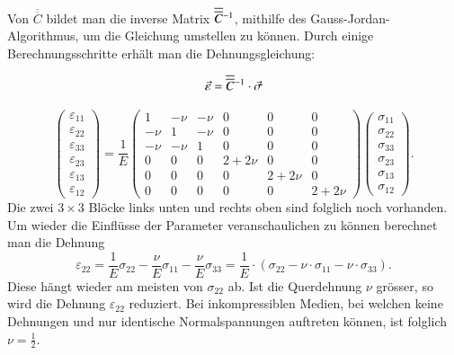 Von  $\overline{\overline{C}}$ bildet man die inverse Matrix $\overline{\overline{C}}\mathstrut^{-1}$, mithilfe des Gauss-Jordan-Algorithmus, um die Gleichung umstellen zu können.
%
Durch einige Berechnungsschritte erhält man die Dehnungsgleichung:

\[
\vec{\varepsilon}
=
\overline{\overline{C}}\mathstrut^{-1}\cdot \vec{\sigma}
\]

\[
\begin{pmatrix}
	\varepsilon_{11}\\
	\varepsilon_{22}\\
	\varepsilon_{33}\\
	\varepsilon_{23}\\
	\varepsilon_{13}\\
	\varepsilon_{12}
\end{pmatrix}
=
\frac{1}{E}
\left(
\begin{array}{ccc|ccc}
	   1 & -\nu & -\nu & 0      & 0      & 0     \\
	-\nu &    1 & -\nu & 0      & 0      & 0     \\
	-\nu & -\nu &    1 & 0      & 0      & 0     \\
\hline
 	   0 &    0 &    0 & 2+2\nu & 0      & 0     \\
	   0 &    0 &    0 &      0 & 2+2\nu & 0     \\
	   0 &    0 &    0 &      0 & 0      & 2+2\nu
\end{array}
\right)
\begin{pmatrix}
	\sigma_{11}\\
	\sigma_{22}\\
	\sigma_{33}\\
	\sigma_{23}\\
	\sigma_{13}\\
	\sigma_{12}
\end{pmatrix}
.
\]
Die zwei $3\times3$ Blöcke links unten und rechts oben sind folglich noch vorhanden.
Um wieder die Einflüsse der Parameter veranschaulichen zu können berechnet man die Dehnung
\[
\varepsilon_{22}
=
\frac{1}{E}\sigma_{22} - \frac{\nu}{E}\sigma_{11} - \frac{\nu}{E}\sigma_{33}
=
\frac{1}{E}\cdot(\sigma_{22}-\nu\cdot\sigma_{11}-\nu\cdot\sigma_{33})
.
\]
Diese hängt wieder am meisten von $\sigma_{22}$ ab.
Ist die Querdehnung $\nu$ grösser, so wird die Dehnung $\varepsilon_{22}$ reduziert.
Bei inkompressiblen Medien, bei welchen keine Dehnungen und nur identische Normalspannungen auftreten können, ist folglich $\nu=\frac12$.
